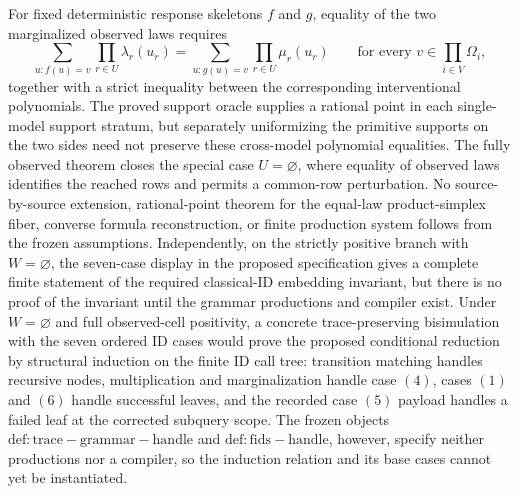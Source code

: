 For fixed deterministic response skeletons \(f\) and \(g\), equality of the two marginalized observed laws requires
\[
 \sum_{u:f(u)=v}\prod_{r\in U}\lambda_r(u_r)
 =\sum_{u:g(u)=v}\prod_{r\in U}\mu_r(u_r)
 \qquad\text{for every }v\in\prod_{i\in V}\Omega_i,
\]
together with a strict inequality between the corresponding interventional polynomials. The proved support oracle supplies a rational point in each single-model support stratum, but separately uniformizing the primitive supports on the two sides need not preserve these cross-model polynomial equalities. The fully observed theorem closes the special case \(U=\varnothing\), where equality of observed laws identifies the reached rows and permits a common-row perturbation. No source-by-source extension, rational-point theorem for the equal-law product-simplex fiber, converse formula reconstruction, or finite production system follows from the frozen assumptions. Independently, on the strictly positive branch with \(W=\varnothing\), the seven-case display in the proposed specification gives a complete finite statement of the required classical-ID embedding invariant, but there is no proof of the invariant until the grammar productions and compiler exist.
Under \(W=\varnothing\) and full observed-cell positivity, a concrete trace-preserving bisimulation with the seven ordered ID cases would prove the proposed conditional reduction by structural induction on the finite ID call tree: transition matching handles recursive nodes, multiplication and marginalization handle case \((4)\), cases \((1)\) and \((6)\) handle successful leaves, and the recorded case \((5)\) payload handles a failed leaf at the corrected subquery scope. The frozen objects \(\mathrm{def:trace-grammar-handle}\) and \(\mathrm{def:fids-handle}\), however, specify neither productions nor a compiler, so the induction relation and its base cases cannot yet be instantiated.
